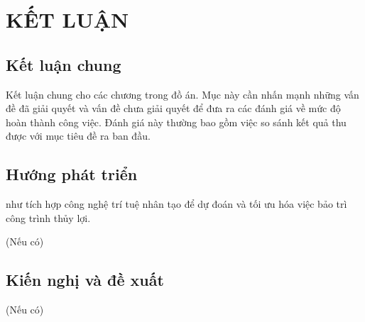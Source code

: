 \documentclass{article} %
\begin{document}
\newpage
\section*{KẾT LUẬN}



\subsection*{Kết luận chung}
Kết luận chung cho các chương trong đồ án. Mục này cần nhấn mạnh những vấn đề đã giải quyết và vấn đề chưa giải quyết để đưa ra các đánh giá về mức độ hoàn thành công việc. Đánh giá này thường bao gồm việc so sánh kết quả thu được với mục tiêu đề ra ban đầu.
\subsection*{Hướng phát triển}
như tích hợp công nghệ trí tuệ nhân tạo để dự đoán và tối 
ưu hóa việc bảo trì công trình thủy lợi.
(Nếu có)
\subsection*{Kiến nghị và đề xuất}
(Nếu có)
\newpage
{}


\cite{How-2025-01-01}
\cite{viblo-2025-01-01}
\cite{What-2025-01-01}
\cite{What1-2025-01-01}
\newpage
\end{document}
